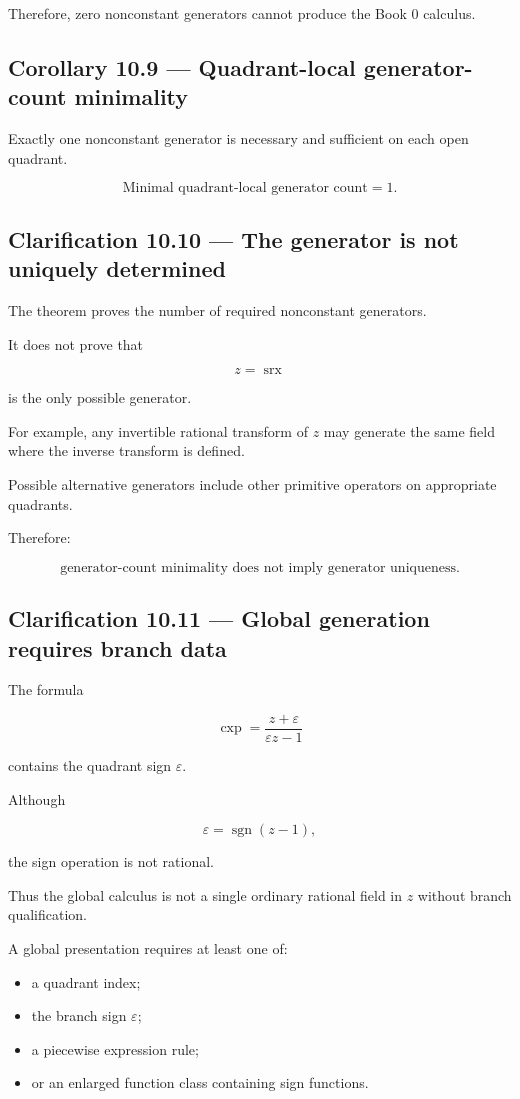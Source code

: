 \documentclass[11pt,oneside,openany]{book}
\newcommand{\PCsubsection}[1]{%
  \subsection*{#1}%
}
\begin{document}
Therefore, zero nonconstant generators cannot produce the Book 0 calculus.

\PCsubsection{Corollary 10.9 --- Quadrant-local generator-count minimality}

Exactly one nonconstant generator is necessary and sufficient on each open quadrant.

\[
\boxed{ \text{Minimal quadrant-local generator count}=1. }
\]

\PCsubsection{Clarification 10.10 --- The generator is not uniquely determined}

The theorem proves the number of required nonconstant generators.

It does not prove that

\[
z=\operatorname{srx}
\]

is the only possible generator.

For example, any invertible rational transform of \(z\) may generate the same field where the inverse transform is defined.

Possible alternative generators include other primitive operators on appropriate quadrants.

Therefore:

\[
\boxed{ \text{generator-count minimality does not imply generator uniqueness.} }
\]

\PCsubsection{Clarification 10.11 --- Global generation requires branch data}

The formula

\[
\operatorname{cxp} = \frac{z+\varepsilon}{\varepsilon z-1}
\]

contains the quadrant sign \(\varepsilon\).

Although

\[
\varepsilon=\operatorname{sgn}(z-1),
\]

the sign operation is not rational.

Thus the global calculus is not a single ordinary rational field in \(z\) without branch qualification.

A global presentation requires at least one of:

\begin{itemize}
\item a quadrant index;
\item the branch sign \(\varepsilon\);
\item a piecewise expression rule;
\item or an enlarged function class containing sign functions.
\end{itemize}
\end{document}
